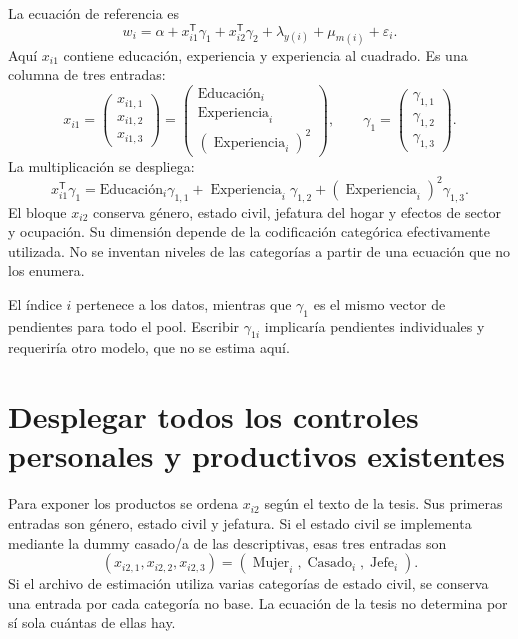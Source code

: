 \documentclass[11pt,a4paper]{article}
\begin{document}
La ecuación de referencia es
\[
w_i=\alpha+x_{i1}^{\mathsf T}\gamma_1+x_{i2}^{\mathsf T}\gamma_2
+\lambda_{y(i)}+\mu_{m(i)}+\varepsilon_i. \tag{T9}
\]
Aquí $x_{i1}$ contiene educación, experiencia y experiencia al cuadrado. Es una columna de tres entradas:
\[
x_{i1}=
\begin{pmatrix}x_{i1,1}\\x_{i1,2}\\x_{i1,3}\end{pmatrix}
=\begin{pmatrix}
\text{Educación}_i\\
\operatorname{Experiencia}_i\\
(\operatorname{Experiencia}_i)^2
\end{pmatrix},\qquad
\gamma_1=\begin{pmatrix}\gamma_{1,1}\\\gamma_{1,2}\\\gamma_{1,3}\end{pmatrix}.
\]
La multiplicación se despliega:
\[
x_{i1}^{\mathsf T}\gamma_1
=\text{Educación}_i\gamma_{1,1}
+\operatorname{Experiencia}_i\gamma_{1,2}
+(\operatorname{Experiencia}_i)^2\gamma_{1,3}.
\]
El bloque $x_{i2}$ conserva género, estado civil, jefatura del hogar y efectos de sector y ocupación. Su dimensión depende de la codificación categórica efectivamente utilizada. No se inventan niveles de las categorías a partir de una ecuación que no los enumera.

El índice $i$ pertenece a los datos, mientras que $\gamma_1$ es el mismo vector de pendientes para todo el pool. Escribir $\gamma_{1i}$ implicaría pendientes individuales y requeriría otro modelo, que no se estima aquí.

\clearpage
\section{Desplegar todos los controles personales y productivos existentes}

Para exponer los productos se ordena $x_{i2}$ según el texto de la tesis. Sus primeras entradas son género, estado civil y jefatura. Si el estado civil se implementa mediante la dummy casado/a de las descriptivas, esas tres entradas son
\[
(x_{i2,1},x_{i2,2},x_{i2,3})
=(\operatorname{Mujer}_i,\operatorname{Casado}_i,\operatorname{Jefe}_i).
\]
Si el archivo de estimación utiliza varias categorías de estado civil, se conserva una entrada por cada categoría no base. La ecuación de la tesis no determina por sí sola cuántas de ellas hay.
\end{document}
